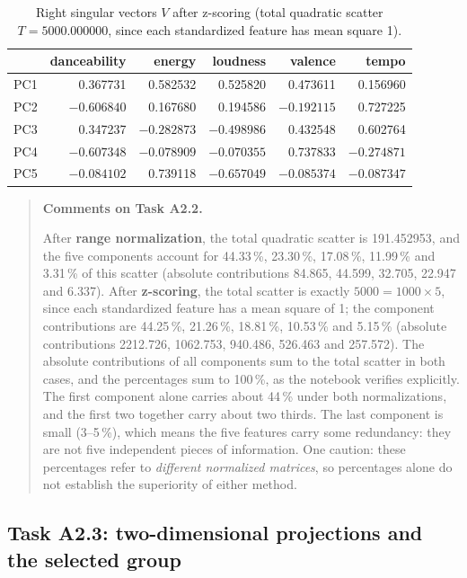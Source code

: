 \documentclass[11pt,letterpaper]{article}
\newenvironment{taskcomments}[1][Comments]{%
  \par\medskip\noindent
  \begin{quote}\small\textbf{#1.}\enspace\ignorespaces
}{%
  \end{quote}\medskip
}
\begin{document}
\begin{table}[H]
\centering
\caption{Right singular vectors $V$ after z-scoring (total quadratic scatter
$T = 5000.000000$, since each standardized feature has mean square 1).}
\label{tab:a2vzscore}
\small
\begin{tabular}{lrrrrr}
\toprule
 & danceability & energy & loudness & valence & tempo \\
\midrule
PC1 &  0.367731 &  0.582532 &  0.525820 &  0.473611 &  0.156960 \\
PC2 & $-0.606840$ &  0.167680 &  0.194586 & $-0.192115$ &  0.727225 \\
PC3 &  0.347237 & $-0.282873$ & $-0.498986$ &  0.432548 &  0.602764 \\
PC4 & $-0.607348$ & $-0.078909$ & $-0.070355$ &  0.737833 & $-0.274871$ \\
PC5 & $-0.084102$ &  0.739118 & $-0.657049$ & $-0.085374$ & $-0.087347$ \\
\bottomrule
\end{tabular}
\end{table}

\begin{taskcomments}[Comments on Task A2.2]
After \textbf{range normalization}, the total quadratic scatter is
191.452953, and the five components account for 44.33\,\%, 23.30\,\%,
17.08\,\%, 11.99\,\% and 3.31\,\% of this scatter (absolute contributions
84.865, 44.599, 32.705, 22.947 and 6.337). After \textbf{z-scoring}, the
total scatter is exactly $5000 = 1000 \times 5$, since each standardized
feature has a mean square of 1; the component contributions are 44.25\,\%,
21.26\,\%, 18.81\,\%, 10.53\,\% and 5.15\,\% (absolute contributions 2212.726,
1062.753, 940.486, 526.463 and 257.572). The absolute contributions of all
components sum to the total scatter in both cases, and the percentages sum to
100\,\%, as the notebook verifies explicitly. The first component alone
carries about 44\,\% under both normalizations, and the first two together
carry about two thirds. The last component is small (3--5\,\%), which means
the five features carry some redundancy: they are not five independent pieces
of information. One caution: these percentages refer to \emph{different
normalized matrices}, so percentages alone do not establish the superiority of
either method.
\end{taskcomments}

\subsection{Task A2.3: two-dimensional projections and the selected group}\label{sec:a2proj}
\end{document}
